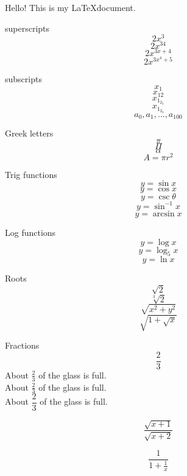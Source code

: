 \documentclass[11pt]{article}
\begin{document}
Hello! This is my \LaTeX document.  

superscripts $$2x^3$$
$$2x^{34}$$
$$2x^{3x+4}$$
$$2x^{3x^4+5}$$

subscripts
$$x_1$$
$$x_{12}$$
$$x_1_{2_3}$$
$$x_{1_{2_3}}$$
$$a_0,a_1,\ldots, a_{100}$$

Greek letters
$$\pi$$
$$\Pi$$
$$\alpha$$
$$A=\pi r^2$$

Trig functions
$$y=\sin x$$
$$y=\cos x$$
$$y=\csc \theta$$
$$y =\sin^{-1} x$$
$$y=\arcsin x$$

Log functions
$$y=\log x$$
$$y=\log_5 x$$
$$y=\ln x$$

Roots
$$\sqrt{2}$$
$$\sqrt[3]{2}$$
$$\sqrt{x^2+y^2}$$
$$\sqrt{1+\sqrt{x}}$$

Fractions
$$\frac{2}{3}$$
About $\displaystyle \frac{2}{3}$ of the glass is full.\\[6pt]
About $\frac{2}{3}$ of the glass is full.\\[10pt]
About $\dfrac{2}{3}$ of the glass is full.

$$\frac{\sqrt{x+1}}{\sqrt{x+2}}$$

$$\frac{1}{1+\frac{1}{x}}$$
\end{document}
